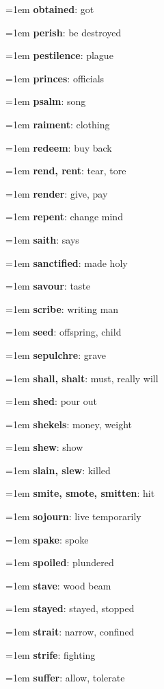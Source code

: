 {\begin{multicols}{3}
{\hangindent=1em \textbf{obtained}: got\par
\hangindent=1em \textbf{perish}: be destroyed\par
\hangindent=1em \textbf{pestilence}: plague\par
\hangindent=1em \textbf{princes}: officials\par
\hangindent=1em \textbf{psalm}: song\par
\hangindent=1em \textbf{raiment}: clothing\par
\hangindent=1em \textbf{redeem}: buy back\par
\hangindent=1em \textbf{rend, rent}: tear, tore\par
\hangindent=1em \textbf{render}: give, pay\par
\hangindent=1em \textbf{repent}: change mind\par
\hangindent=1em \textbf{saith}: says\par
\hangindent=1em \textbf{sanctified}: made holy\par
\hangindent=1em \textbf{savour}: taste\par
\hangindent=1em \textbf{scribe}: writing man\par
\hangindent=1em \textbf{seed}: offspring, child\par
\hangindent=1em \textbf{sepulchre}: grave\par
\hangindent=1em \textbf{shall, shalt}: must, really will\par
\hangindent=1em \textbf{shed}: pour out\par
\hangindent=1em \textbf{shekels}: money, weight\par
\hangindent=1em \textbf{shew}: show\par
\hangindent=1em \textbf{slain, slew}: killed\par
\hangindent=1em \textbf{smite, smote, smitten}: hit\par
\hangindent=1em \textbf{sojourn}: live temporarily\par
\hangindent=1em \textbf{spake}: spoke\par
\hangindent=1em \textbf{spoiled}: plundered\par
\hangindent=1em \textbf{stave}: wood beam\par
\hangindent=1em \textbf{stayed}: stayed, stopped\par
\hangindent=1em \textbf{strait}: narrow, confined\par
\hangindent=1em \textbf{strife}: fighting\par
\hangindent=1em \textbf{suffer}: allow, tolerate\par
}
\end{multicols}}
